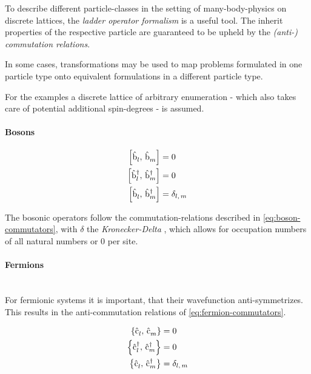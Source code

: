 To describe different particle-classes in the setting of many-body-physics on discrete lattices, the \emph{ladder operator formalism} is a useful tool. 
The inherit properties of the respective particle are guaranteed to be upheld by the \emph{(anti-) commutation relations}.

In some cases, transformations may be used to map problems formulated in one particle type onto equivalent formulations in a different particle type.

For the examples a discrete lattice of arbitrary enumeration - which also takes care of potential additional spin-degrees - is assumed.

\paragraph{Bosons}

\begin{equation}
    \label{eq:boson-commutators}
    \begin{split}
        \left[\hat{\text{b}}^{ }_{l},\,\hat{\text{b}}^{ }_{m}\right] &= 0\\
        \left[\hat{\text{b}}^{\dagger }_{l},\,\hat{\text{b}}^{\dagger }_{m}\right] &= 0\\
        \left[\hat{\text{b}}^{ }_{l},\,\hat{\text{b}}^{\dagger }_{m}\right] &= \delta_{l,\,m}\\
    \end{split}
\end{equation}

The bosonic operators follow the commutation-relations described in \autoref{eq:boson-commutators}, with $\delta$ the \emph{Kronecker-Delta} \cite{schwablBookII}, which allows for occupation numbers of all natural numbers or $0$ per site.

\paragraph{Fermions}\makebox{}\\

For fermionic systems it is important, that their wavefunction anti-symmetrizes. This results in the anti-commutation relations of  \autoref{eq:fermion-commutators}.

\begin{equation}
    \label{eq:fermion-commutators}
    \begin{split}
        \left\{\hat{\text{c}}^{ }_{l},\,\hat{\text{c}}^{ }_{m}\right\} &= 0\\
        \left\{\hat{\text{c}}^{\dagger }_{l},\,\hat{\text{c}}^{\dagger }_{m}\right\} &= 0\\
        \left\{\hat{\text{c}}^{ }_{l},\,\hat{\text{c}}^{\dagger }_{m}\right\} &= \delta_{l,\,m}\\
    \end{split}
\end{equation}

